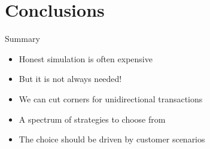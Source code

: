 \section{Conclusions}

\begin{frame}{Summary}
\begin{itemize}
\item Honest simulation is often expensive
\item But it is not always needed!
\item We can cut corners for unidirectional transactions
\item A spectrum of strategies to choose from
\item The choice should be driven by customer scenarios
\end{itemize}
\end{frame}



\finalslide


